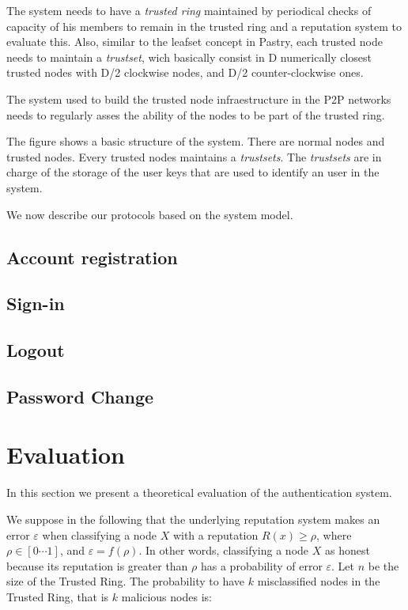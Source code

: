 The system needs to have a \textit{trusted ring} maintained by periodical
checks of capacity of his members to remain in the trusted ring and a
reputation system to evaluate this. Also, similar to the
leafset concept in Pastry, each trusted node needs to maintain a
\textit{trustset}, wich basically consist in D numerically closest trusted
nodes with D/2 clockwise nodes, and D/2 counter-clockwise ones.

The system used to build the trusted node infraestructure in the P2P networks
needs to regularly asses the ability of the nodes to be part of the trusted
ring.

The figure shows a basic structure of the system. There are normal nodes and
trusted nodes. Every trusted nodes maintains a \textit{trustsets}.
The \textit{trustsets} are in charge of the storage of the user keys that are
used to identify an user in the system.

We now describe our protocols based on the system model. 

\section{Account registration}
\section{Sign-in}
\section{Logout}
\section{Password Change}

\chapter{Evaluation}

In this section we present a theoretical evaluation of
the authentication system.


We suppose in the following that the underlying
reputation system makes an error $\varepsilon$ when classifying a
node $X$ with a reputation $R(x) \geq \rho$, where $\rho \in [ 0 \cdots 1 ]$,
and $ \varepsilon = f ( \rho )$. In other words, classifying a node $X$ as
honest because its reputation is greater than $\rho$ has a
probability of error $\varepsilon$.
Let $n$ be the size of the Trusted Ring. The probability
to have $k$ misclassified nodes in the Trusted Ring, that
is $k$ malicious nodes is:

